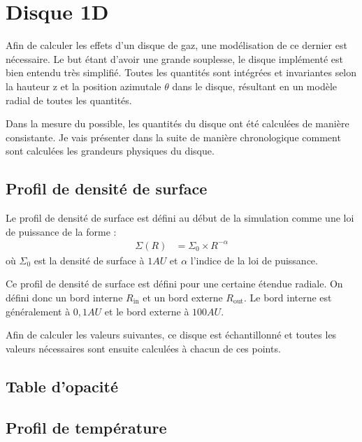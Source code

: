 \documentclass[logos,parttoc]{bordeaux-thesis}
\begin{document}


\section{Disque 1D}
Afin de calculer les effets d'un disque de gaz, une modélisation de ce dernier est nécessaire. Le but étant d'avoir une grande souplesse, le disque implémenté est bien entendu très simplifié. Toutes les quantités sont intégrées et invariantes selon la hauteur z et la position azimutale $\theta$ dans le disque, résultant en un modèle radial de toutes les quantités. 

Dans la mesure du possible, les quantités du disque ont été calculées de manière consistante. Je vais présenter dans la suite de manière chronologique comment sont calculées les grandeurs physiques du disque.
\subsection{Profil de densité de surface}
Le profil de densité de surface est défini au début de la simulation comme une loi de puissance de la forme :
\begin{align}
\Sigma(R) &= \Sigma_0 \times R^{-\alpha}
\end{align}
où $\Sigma_0$ est la densité de surface à $1\unit{AU}$ et $\alpha$ l'indice de la loi de puissance. 

Ce profil de densité de surface est défini pour une certaine étendue radiale. On défini donc un bord interne $R_\text{in}$ et un bord externe $R_\text{out}$. Le bord interne est généralement à $0,1\unit{AU}$ et le bord externe à $100\unit{AU}$. 

Afin de calculer les valeurs suivantes, ce disque est échantillonné et toutes les valeurs nécessaires sont ensuite calculées à chacun de ces points. 

\subsection{Table d'opacité}
\subsection{Profil de température}
\end{document}

